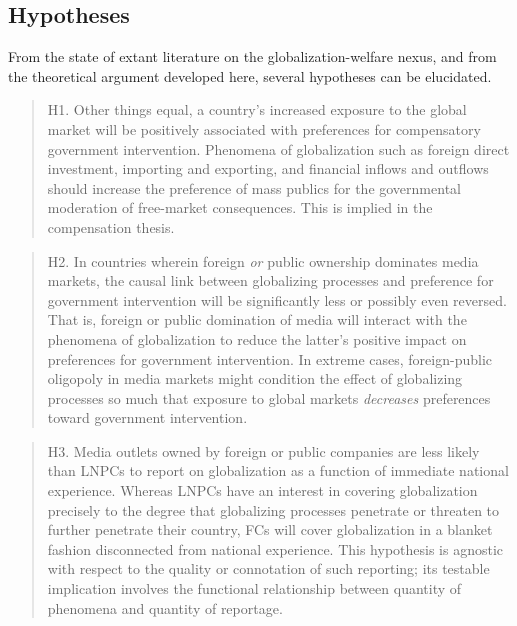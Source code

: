 \documentclass[12pt]{report}
\begin{document}
\subsection{Hypotheses}
From the state of extant literature on the globalization-welfare nexus, and from the theoretical argument developed here, several hypotheses can be elucidated.

\singlespacing
\begin{quote}
H1. Other things equal, a country's increased exposure to the global market will be positively associated with preferences for compensatory government intervention. Phenomena of globalization such as foreign direct investment, importing and exporting, and financial inflows and outflows should increase the preference of mass publics for the governmental moderation of free-market consequences. This is implied in the compensation thesis.
\end{quote}
\doublespacing

\singlespacing
\begin{quote}
H2. In countries wherein foreign \emph{or} public ownership dominates media markets, the causal link between globalizing processes and preference for government intervention will be significantly less or possibly even reversed. That is, foreign or public domination of media will interact with the phenomena of globalization to reduce the latter's positive impact on preferences for government intervention. In extreme cases, foreign-public oligopoly in media markets might condition the effect of globalizing processes so much that exposure to global markets \emph{decreases} preferences toward government intervention.
\end{quote}
\doublespacing

\singlespacing
\begin{quote}
H3. Media outlets owned by foreign or public companies are less likely than LNPCs to report on globalization as a function of immediate national experience. Whereas LNPCs have an interest in covering globalization precisely to the degree that globalizing processes penetrate or threaten to further penetrate their country, FCs will cover globalization in a blanket fashion disconnected from national experience. This hypothesis is agnostic with respect to the quality or connotation of such reporting; its testable implication involves the functional relationship between quantity of phenomena and quantity of reportage.
\end{quote}
\doublespacing
\end{document}

